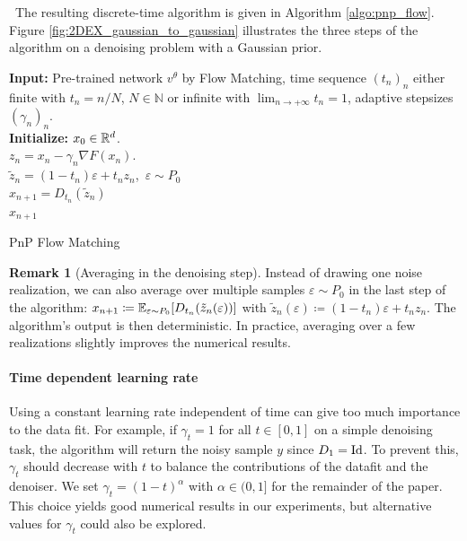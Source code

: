 \documentclass{article} %
\newcommand{\N}{\mathbb{N}}	%
\theoremstyle{definition}
\newtheorem{remark}[theorem]{Remark}
\begin{document}
\
The resulting discrete-time algorithm is given in Algorithm \ref{algo:pnp_flow}. Figure \ref{fig:2DEX_gaussian_to_gaussian}  illustrates the three steps of the algorithm on a denoising problem with a Gaussian prior. 
%
\begin{center}
\begin{algorithm} 
\textbf{Input:} Pre-trained network $v^\theta$ by Flow Matching, time sequence $(t_n)_n$ either finite with $t_n= n/N$, $N \in \N$ or infinite with $\lim_{n \rightarrow +\infty} t_n = 1$, adaptive stepsizes $(\gamma_n)_n$.\\
\textbf{Initialize:} $x_{0} \in \mathbb{R}^d$.\\
{
   $z_{n} = x_{n}-  \gamma_{n} \nabla F( x_{n}) $.  \\
   $\tilde z_{n} = (1-t_n)  \varepsilon +  t_n z_n $, \,$\varepsilon \sim P_0$ \quad {} \\
   $x_{n+1} = D_{t_n} (\tilde{z}_n) $ \algorithmiccomment{PnP step with denoiser \eqref{eq:denoiser}} \\
}
\Return $x_{n+1}$
\caption{PnP Flow Matching\label{algo:pnp_flow}}
\end{algorithm}
\end{center}
\vspace{-0.8cm}
\begin{remark}[Averaging in the denoising step]
Instead of drawing one noise realization, we can also average over multiple samples $\varepsilon \sim P_0$ in the last step of the algorithm:
$x_{n+1} \coloneqq \mathbb{E}_{\varepsilon \sim P_0}[D_{t_n} (\tilde{z}_n(\varepsilon))]$ with $\tilde z_{n}(\varepsilon) \coloneqq (1-t_n)  \varepsilon +  t_n z_n $.
The algorithm's output is then deterministic. In practice, averaging over a few realizations slightly improves the numerical results.
\end{remark}

\paragraph{Time dependent learning rate} Using a constant learning rate independent of time can give too much importance to the data fit.  
For example, if $\gamma_t = 1$ for all $t \in [0,1]$ on a simple denoising task, the algorithm will return the noisy sample $y$ since $D_1 = \rm{Id}$. To prevent this, $\gamma_t$ should decrease with $t$ to balance the contributions of the datafit and the denoiser. We set $\gamma_t = (1-t)^\alpha$ with $\alpha \in (0,1]$ for the remainder of the paper. This choice yields good numerical results in our experiments, but alternative values for $\gamma_t$ could also be explored.
\end{document}
